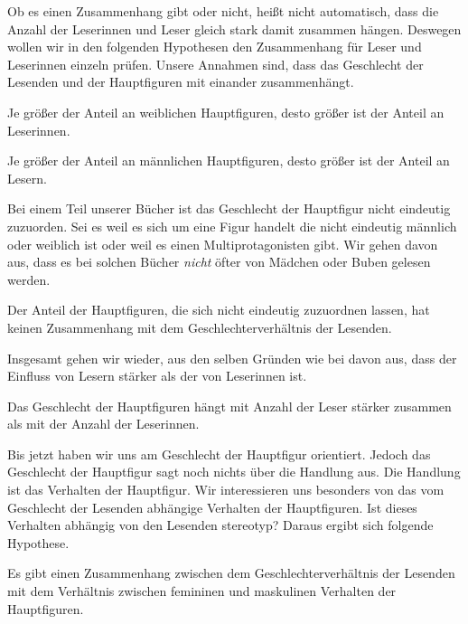 Ob es einen Zusammenhang gibt oder nicht, heißt nicht automatisch, dass
die Anzahl der Leserinnen und Leser gleich stark damit zusammen hängen.
Deswegen wollen wir in den folgenden Hypothesen den Zusammenhang für
Leser und Leserinnen einzeln prüfen. Unsere Annahmen sind, dass das
Geschlecht der Lesenden und der Hauptfiguren mit einander zusammenhängt.

\begin{subhyp}\label{h2.1}
       Je größer der Anteil an weiblichen Hauptfiguren,
        desto größer ist der Anteil an Leserinnen.
\end{subhyp}

\begin{subhyp}\label{h2.2}
       Je größer der Anteil an männlichen Hauptfiguren,
        desto größer ist der Anteil an Lesern.
\end{subhyp}

Bei einem Teil unserer Bücher ist das Geschlecht der Hauptfigur nicht
eindeutig zuzuorden. Sei es weil es sich um eine Figur handelt die nicht
eindeutig männlich oder weiblich ist oder weil es einen
Multiprotagonisten gibt. Wir gehen davon aus, dass es bei solchen Bücher
\emph{nicht} öfter von Mädchen oder Buben gelesen werden.

\begin{subhyp}\label{h2.3}
    Der Anteil der Hauptfiguren, die sich nicht eindeutig zuzuordnen lassen,   hat keinen Zusammenhang mit dem Geschlechterverhältnis der Lesenden.
\end{subhyp}

Insgesamt gehen wir wieder, aus den selben Gründen wie bei
 davon aus, dass der Einfluss von Lesern stärker als
der von Leserinnen ist.

\begin{subhyp}\label{h2.4}
   Das Geschlecht der Hauptfiguren hängt mit Anzahl der Leser stärker zusammen als mit der Anzahl der Leserinnen.
\end{subhyp}

Bis jetzt haben wir uns am Geschlecht der Hauptfigur orientiert. Jedoch
das Geschlecht der Hauptfigur sagt noch nichts über die Handlung aus.
Die Handlung ist das Verhalten der Hauptfigur. Wir interessieren uns
besonders von das vom Geschlecht der Lesenden abhängige Verhalten der
Hauptfiguren. Ist dieses Verhalten abhängig von den Lesenden stereotyp?
Daraus ergibt sich folgende Hypothese.

\begin{hyp}\label{h3}
   Es gibt einen Zusammenhang zwischen dem Geschlechterverhältnis der Lesenden
    mit  dem Verhältnis zwischen femininen und maskulinen Verhalten der Hauptfiguren.
\end{hyp}

